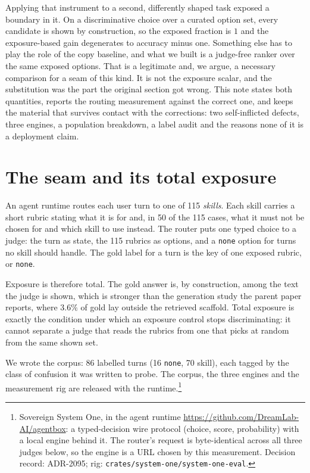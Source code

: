 \documentclass[10pt,twocolumn]{article}
\begin{document}
Applying that instrument to a second, differently shaped task exposed a boundary in it.
On a discriminative choice over a curated option set, every candidate is shown by
construction, so the exposed fraction is $1$ and the exposure-based gain degenerates to
accuracy minus one. Something else has to play the role of the copy baseline, and what we
built is a judge-free ranker over the same exposed options. That is a legitimate and, we
argue, a necessary comparison for a seam of this kind. It is not the exposure scalar, and
the substitution was the part the original section got wrong. This note states both
quantities, reports the routing measurement against the correct one, and keeps the material
that survives contact with the corrections: two self-inflicted defects, three engines, a
population breakdown, a label audit and the reasons none of it is a deployment claim.

\section{The seam and its total exposure}\label{sec:task}
An agent runtime routes each user turn to one of 115 \emph{skills}. Each skill carries a
short rubric stating what it is for and, in 50 of the 115 cases, what it must not be chosen
for and which skill to use instead. The router puts one typed choice to a judge: the turn as
state, the 115 rubrics as options, and a \texttt{none} option for turns no skill should
handle. The gold label for a turn is the key of one exposed rubric, or \texttt{none}.

Exposure is therefore total. The gold answer is, by construction, among the text the judge
is shown, which is stronger than the generation study the parent paper reports, where
$3.6\%$ of gold lay outside the retrieved scaffold. Total exposure is exactly the condition
under which an exposure control stops discriminating: it cannot separate a judge that reads
the rubrics from one that picks at random from the same shown set.

We wrote the corpus: 86 labelled turns (16 \texttt{none}, 70 skill), each tagged by the
class of confusion it was written to probe. The corpus, the three engines and the
measurement rig are released with the runtime.\footnote{Sovereign System One, in the agent
runtime \url{https://github.com/DreamLab-AI/agentbox}: a typed-decision wire protocol
(choice, score, probability) with a local engine behind it. The router's request is
byte-identical across all three judges below, so the engine is a URL chosen by this
measurement. Decision record: ADR-2095; rig:
\texttt{crates/system-one/system-one-eval}.}
\end{document}
